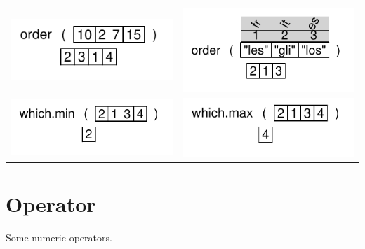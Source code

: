 \documentclass[pdflatex]{article}
\begin{document}
\begin{tabular}{cc}
\includegraphics{order} & \includegraphics{order2}\\
\includegraphics{which_min} & \includegraphics{which_max}\\
\end{tabular}

\section{Operator}

Some numeric operators.
\end{document}
